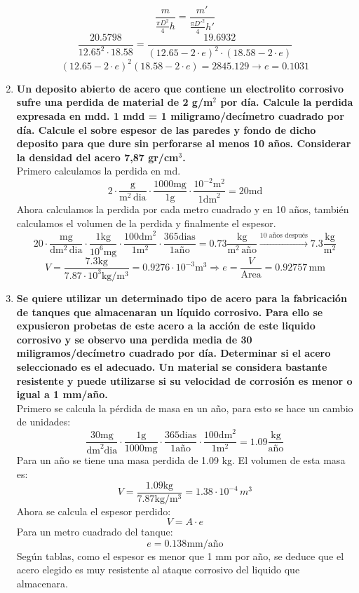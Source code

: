\documentclass[a4paper,12pt]{report}
\begin{document}
\begin{enumerate}
$$
\frac{m}{\frac{\pi D^{2}}{4} h} = \frac{m'}{\frac{\pi D'^{2}}{4} h'} 
$$
$$
\frac{20.5798}{12.65^{2} \cdot 18.58} = \frac{19.6932}{(12.65-2\cdot e)^{2} \cdot (18.58-2\cdot e)} 
$$
$$
(12.65-2\cdot e)^{2}(18.58-2\cdot e) = 2845.129 \longrightarrow e=0.1031
$$
\item \textbf{Un deposito abierto de acero que contiene un electrolito corrosivo sufre una perdida de material de 2 g/m$^{2}$ por día. Calcule la perdida expresada en mdd. 1 mdd = 1 miligramo/decímetro cuadrado por día. Calcule el sobre espesor  de las paredes y fondo de dicho deposito para que dure sin perforarse al menos 10 años. Considerar la densidad del acero 7,87 gr/cm$^{3}$.}\\
Primero calculamos la perdida en md.
$$
2\cdot \frac{\mathrm{g}}{\mathrm{m^{2}} \, \mathrm{dia}} \cdot \frac{1000 \mathrm{mg}}{1 \mathrm{g}} \cdot \frac{10^{-2} \mathrm{m}^{2}}{1 \mathrm{dm}^{2}} = 20 \mathrm{md}
$$
Ahora calculamos la perdida por cada metro cuadrado y en 10 años, también calculamos el volumen de la perdida y finalmente el espesor.
$$
20 \cdot \frac{\mathrm{mg}}{\mathrm{dm^{2}} \, \mathrm{dia}} \cdot \frac{1 \mathrm{kg}}{10^{6} \mathrm{mg}} \cdot \frac{100 \mathrm{dm}^{2}}{1 \mathrm{m}^{2}} \cdot \frac{365 \mathrm{dias}}{1 \text{año}} = 0.73 \frac{\mathrm{kg}}{\mathrm{m}^{2} \, \text{año}} \xrightarrow{\text{10 años después}} 7.3 \frac{\mathrm{kg}}{\mathrm{m}^{2}}
$$
$$
V=\frac{7.3 \text{kg}}{7.87\cdot 10^{3} \text{kg}/\mathrm{m}^{3}} = 0.9276 \cdot 10^{-3} \mathrm{m}^{3} \Longrightarrow e=\frac{V}{\mathrm{Area}} = 0.92757  \, \mathrm{mm}
$$
\item \textbf{Se quiere utilizar un determinado tipo de acero para la fabricación de tanques que almacenaran un líquido corrosivo. Para ello se expusieron probetas de este acero a la acción de este liquido corrosivo y se observo una perdida media de 30 miligramos/decímetro cuadrado por día.  Determinar si el acero seleccionado es el adecuado. Un material se considera bastante resistente y puede utilizarse si su velocidad de corrosión  es menor o igual a 1 mm/año.}\\
Primero se calcula la pérdida de masa en un año, para esto se hace un cambio de unidades:
$$
\frac{30 \mathrm{mg}}{\mathrm{dm}^{2}\mathrm{dia}} \cdot \frac{1\mathrm{g}}{1000\mathrm{mg}}\cdot \frac{365 \mathrm{dias}}{1 \mathrm{a\text{ñ}o}} \cdot \frac{100 \mathrm{dm}^{2}}{1 \mathrm{m}^{2}} = 1.09 \frac{\mathrm{kg}}{\text{año}}
$$
Para un año se tiene una masa perdida de 1.09 kg. El volumen de esta masa es:
$$
V=\frac{1.09 \mathrm{kg}}{7.87 \mathrm{kg/m^{3}}} = 1.38\cdot 10^{-4} \, m^{3}
$$
Ahora se calcula el espesor perdido:
$$
V=A\cdot e
$$
Para un metro cuadrado del tanque:
$$
e=0.138 \mathrm{mm/\text{año}}
$$
Según tablas, como el espesor es menor que 1 mm por año, se deduce que el acero elegido es muy resistente al ataque corrosivo del liquido que almacenara.
\end{enumerate}
\end{document}
